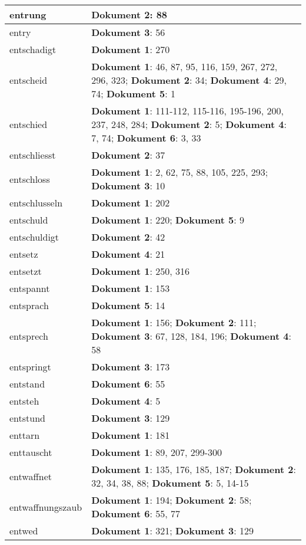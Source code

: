 \documentclass[a5paper]{article}
\begin{document}
\begin{longtable}[l]{|l|p{3in}|}
\hline
entrung & \textbf{Dokument 2}: 88 \\
\hline
entry & \textbf{Dokument 3}: 56 \\
\hline
entschadigt & \textbf{Dokument 1}: 270 \\
\hline
entscheid & \textbf{Dokument 1}: 46, 87, 95, 116, 159, 267, 272, 296, 323; \textbf{Dokument 2}: 34; \textbf{Dokument 4}: 29, 74; \textbf{Dokument 5}: 1 \\
\hline
entschied & \textbf{Dokument 1}: 111-112, 115-116, 195-196, 200, 237, 248, 284; \textbf{Dokument 2}: 5; \textbf{Dokument 4}: 7, 74; \textbf{Dokument 6}: 3, 33 \\
\hline
entschliesst & \textbf{Dokument 2}: 37 \\
\hline
entschloss & \textbf{Dokument 1}: 2, 62, 75, 88, 105, 225, 293; \textbf{Dokument 3}: 10 \\
\hline
entschlusseln & \textbf{Dokument 1}: 202 \\
\hline
entschuld & \textbf{Dokument 1}: 220; \textbf{Dokument 5}: 9 \\
\hline
entschuldigt & \textbf{Dokument 2}: 42 \\
\hline
entsetz & \textbf{Dokument 4}: 21 \\
\hline
entsetzt & \textbf{Dokument 1}: 250, 316 \\
\hline
entspannt & \textbf{Dokument 1}: 153 \\
\hline
entsprach & \textbf{Dokument 5}: 14 \\
\hline
entsprech & \textbf{Dokument 1}: 156; \textbf{Dokument 2}: 111; \textbf{Dokument 3}: 67, 128, 184, 196; \textbf{Dokument 4}: 58 \\
\hline
entspringt & \textbf{Dokument 3}: 173 \\
\hline
entstand & \textbf{Dokument 6}: 55 \\
\hline
entsteh & \textbf{Dokument 4}: 5 \\
\hline
entstund & \textbf{Dokument 3}: 129 \\
\hline
enttarn & \textbf{Dokument 1}: 181 \\
\hline
enttauscht & \textbf{Dokument 1}: 89, 207, 299-300 \\
\hline
entwaffnet & \textbf{Dokument 1}: 135, 176, 185, 187; \textbf{Dokument 2}: 32, 34, 38, 88; \textbf{Dokument 5}: 5, 14-15 \\
\hline
entwaffnungszaub & \textbf{Dokument 1}: 194; \textbf{Dokument 2}: 58; \textbf{Dokument 6}: 55, 77 \\
\hline
entwed & \textbf{Dokument 1}: 321; \textbf{Dokument 3}: 129 \\

\end{longtable}
\end{document}
